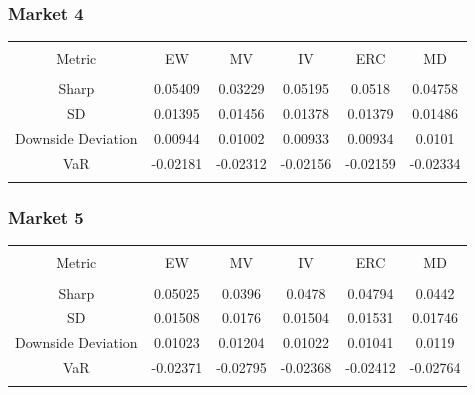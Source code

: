 \documentclass[11pt,preprint, authoryear]{elsarticle}
\let\origtable\table
\let\endorigtable\endtable
\renewenvironment{table}[1][2] {
    \expandafter\origtable\expandafter[H]
} {
    \endorigtable
}
\numberwithin{equation}{section}
\numberwithin{figure}{section}
\numberwithin{table}{section}
\begin{document}
\hypertarget{market-4}{%
\subsubsection{Market 4}\label{market-4}}

\begin{table}[!htbp] \centering 
  \caption{Market 4 Risk Metrics} 
  \label{eigens} 
\begin{tabular}{@{\extracolsep{5pt}} cccccc} 
\\[-1.8ex]\hline 
\hline \\[-1.8ex] 
Metric & EW & MV & IV & ERC & MD \\ 
\hline \\[-1.8ex] 
Sharp & 0.05409 & 0.03229 & 0.05195 & 0.0518 & 0.04758 \\ 
SD & 0.01395 & 0.01456 & 0.01378 & 0.01379 & 0.01486 \\ 
Downside Deviation & 0.00944 & 0.01002 & 0.00933 & 0.00934 & 0.0101 \\ 
VaR & -0.02181 & -0.02312 & -0.02156 & -0.02159 & -0.02334 \\ 
\hline \\[-1.8ex] 
\end{tabular} 
\end{table}

\hypertarget{market-5}{%
\subsubsection{Market 5}\label{market-5}}

\begin{table}[!htbp] \centering 
  \caption{Market 5 Risk Metrics} 
  \label{eigens} 
\begin{tabular}{@{\extracolsep{5pt}} cccccc} 
\\[-1.8ex]\hline 
\hline \\[-1.8ex] 
Metric & EW & MV & IV & ERC & MD \\ 
\hline \\[-1.8ex] 
Sharp & 0.05025 & 0.0396 & 0.0478 & 0.04794 & 0.0442 \\ 
SD & 0.01508 & 0.0176 & 0.01504 & 0.01531 & 0.01746 \\ 
Downside Deviation & 0.01023 & 0.01204 & 0.01022 & 0.01041 & 0.0119 \\ 
VaR & -0.02371 & -0.02795 & -0.02368 & -0.02412 & -0.02764 \\ 
\hline \\[-1.8ex] 
\end{tabular} 
\end{table}
\end{document}

